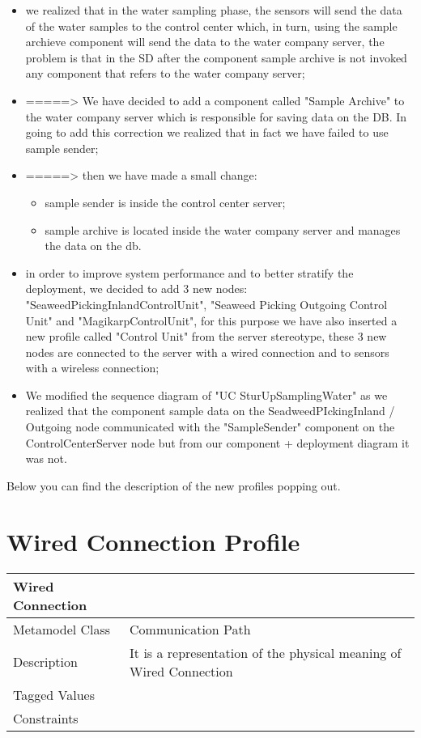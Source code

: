 \begin{itemize}
\item we realized that in the water sampling phase, the sensors will 		send the data of the water samples to the control center which, in 	turn, using the sample archieve component will send the data to 		the water company server, the problem is that in the SD after the 		component sample archive is not invoked any component that refers 		to the water company server;
\item =====> We have decided to add a component called "Sample 				Archive" to the water company server which is responsible for 			saving data on the DB. In going to add this correction we realized 	that in fact we have failed to use sample sender;
\item =====> then we have made a small change: 
	\begin{itemize}
	\item sample sender is inside 	the control center server;
	\item sample archive is located inside the water company server 			and	manages the data on the db.
	\end{itemize}	 
\item in order to improve system performance and to better stratify 		the deployment, we decided to add 3 new nodes: 							"SeaweedPickingInlandControlUnit", "Seaweed Picking Outgoing 			Control Unit" and "MagikarpControlUnit", for this purpose we have 		also inserted a new profile called "Control Unit" from the 	server 	stereotype, these 3 new nodes are connected to the 	server with a 		wired connection and to sensors with a wireless connection;
\item We modified the sequence diagram of "UC SturUpSamplingWater" as 		we realized that the component sample data on the 						SeadweedPIckingInland / Outgoing node communicated with the 			"SampleSender" component on the ControlCenterServer node but from 		our component + deployment diagram it was not.
\end{itemize}
Below you can find the description of the new profiles popping out.

\section{Wired Connection Profile}

\begin{longtable}{|p{4cm}|p{9cm}|}

\hline
\textbf{Wired Connection} & \\


\hline
Metamodel Class & Communication Path\\

\hline
Description & It is a representation of the physical meaning of Wired Connection\\

\hline
Tagged Values & \\

\hline
Constraints &\\

\hline
\end{longtable}
  
